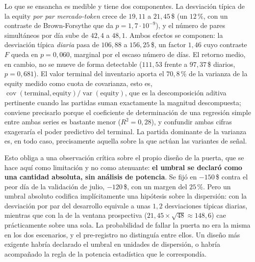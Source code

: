Lo que se ensancha es medible y tiene dos componentes. La desviación típica de la equity
\emph{por par mercado-token} crece de $19{,}11$ a $21{,}45$\,\$ (un $12$\,\%, con un
contraste de Brown-Forsythe que da $p = 1{,}7\cdot 10^{-9}$), y el número de pares
simultáneos por día sube de $42{,}4$ a $48{,}1$. Ambos efectos se componen: la desviación
típica \emph{diaria} pasa de $106{,}88$ a $156{,}25$\,\$, un factor $1{,}46$ cuyo
contraste $F$ queda en $p = 0{,}060$, marginal por el escaso número de días. El retorno
medio, en cambio, no se mueve de forma detectable ($111{,}53$ frente a $97{,}37$\,\$
diarios, $p = 0{,}681$). El valor terminal del inventario aporta el $70{,}8$\,\% de la
varianza de la equity medido como cuota de covarianza, esto es,
$\operatorname{cov}(\text{terminal},\text{equity})/\operatorname{var}(\text{equity})$,
que es la descomposición aditiva pertinente cuando las partidas suman exactamente la
magnitud descompuesta; conviene precisarlo porque el coeficiente de determinación de una
regresión simple entre ambas series es bastante menor ($R^{2} = 0{,}28$), y confundir
ambas cifras exageraría el poder predictivo del terminal. La partida dominante de la
varianza es, en todo caso, precisamente aquella sobre la que actúan las variantes de señal.

Esto obliga a una observación crítica sobre el propio diseño de la puerta, que se hace
aquí como limitación y no como atenuante: \textbf{el umbral se declaró como una cantidad
absoluta, sin análisis de potencia}. Se fijó en $-150$\,\$ contra el peor día de la
validación de julio, $-120$\,\$, con un margen del $25$\,\%. Pero un umbral absoluto
codifica implícitamente una hipótesis sobre la dispersión: con la desviación por par del
desarrollo equivale a unas $1{,}2$ desviaciones típicas diarias, mientras que con la de la
ventana prospectiva ($21{,}45 \times \sqrt{48} \approx 148{,}6$) cae prácticamente sobre
una sola. La probabilidad de fallar la puerta no era la misma en los dos escenarios, y el
pre-registro no distinguía entre ellos. Un diseño más exigente habría declarado el umbral
en unidades de dispersión, o habría acompañado la regla de la potencia estadística que le
correspondía.


